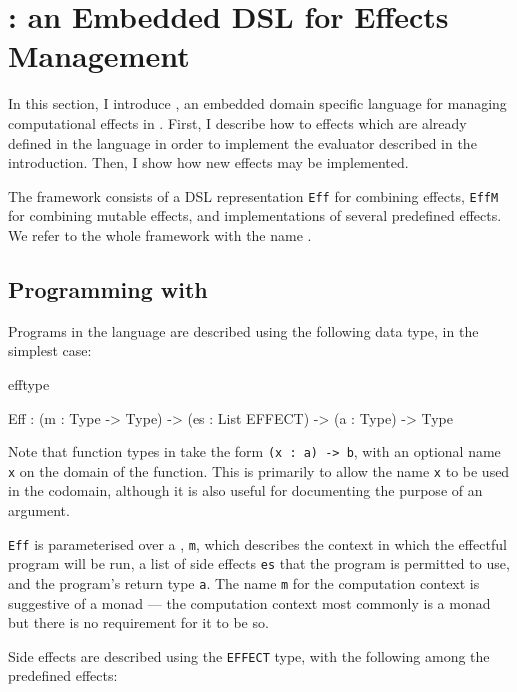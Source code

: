 \section{\Eff{}: an Embedded DSL for Effects Management} 

In this section, I introduce \Eff{}, an embedded domain specific language
for managing computational effects in \Idris{}. First, I describe how to
 effects which are already defined in the language in order to
implement the evaluator described in the introduction. Then, I show how new
effects may be implemented. 

The framework consists of a DSL representation \texttt{Eff} for combining
effects, \texttt{EffM} for combining mutable effects, and implementations
of several predefined effects. We refer to the whole framework with the
name \Eff{}.

\label{sect:effdsl}

\subsection{Programming with \Eff{}}

Programs in the \Eff{} language are described using the following data type,
in the simplest case:

\begin{SaveVerbatim}{efftype}

Eff : (m  : Type -> Type) -> 
      (es : List EFFECT) -> (a  : Type) -> Type

\end{SaveVerbatim}

\noindent
Note that function types in \Idris{} take the form \texttt{(x : a) -> b}, with
an optional name \texttt{x} on the domain of the function. This is primarily
to allow the name \texttt{x} to be used in the codomain, although it is also
useful for documenting the purpose of an argument.

\texttt{Eff} is parameterised over a , \texttt{m}, which
describes the context in which the effectful program will be run, a list
of side effects \texttt{es} that the program is permitted to use, 
and the program's return type \texttt{a}. The name \texttt{m} for the computation
context is suggestive of a monad --- the computation context most commonly 
is a monad but there is no requirement for it to be so.

Side effects are described using the \texttt{EFFECT} type, with the following
among the predefined effects:

